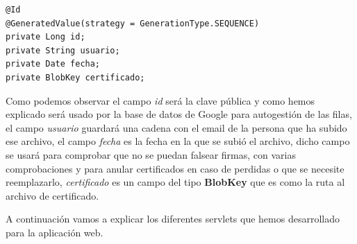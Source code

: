 \begin{description}
\begin{lstlisting}[style=Java]
@Id
@GeneratedValue(strategy = GenerationType.SEQUENCE)
private Long id;
private String usuario;
private Date fecha;
private BlobKey certificado;
\end{lstlisting}

Como podemos observar el campo \textit{id} será la clave pública y como hemos explicado será usado por la base de datos de Google para autogestión de las filas, el campo \textit{usuario} guardará una cadena con el email de la persona que ha subido ese archivo, el campo \textit{fecha} es la fecha en la que se subió el archivo, dicho campo se usará para comprobar que no se puedan falsear firmas, con varias comprobaciones y para anular certificados en caso de perdidas o que se necesite reemplazarlo, \textit{certificado} es un campo del tipo \textbf{BlobKey} que es como la ruta al archivo de certificado.

\end{description}
A continuación vamos a explicar los diferentes servlets que hemos desarrollado para la aplicación web.

